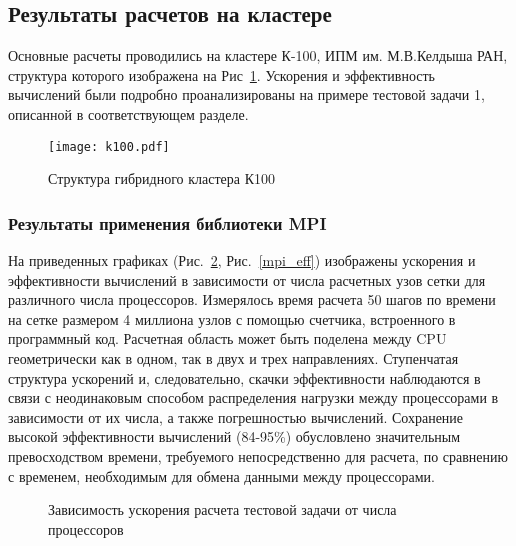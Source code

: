 \subsection{Результаты расчетов на кластере}

Основные расчеты проводились на кластере К-100, ИПМ им. М.В.Келдыша РАН, 
структура которого изображена на Рис~\ref{pic_k100}.
Ускорения и эффективность вычислений
были подробно проанализированы на примере тестовой задачи 1, описанной в соответствующем
разделе. 

\begin{figure}[!h]\center
\texttt{[image: k100.pdf]} 
\caption{Структура гибридного кластера К100}
\label{pic_k100}
\end{figure}

\subsubsection*{Результаты применения библиотеки MPI}

На приведенных графиках (Рис.~\ref{mpi_speedup}, Рис.~\ref{mpi_eff}) изображены
ускорения и эффективности вычислений в зависимости от числа расчетных узов сетки для 
различного числа процессоров.
Измерялось время расчета 50 шагов по времени на сетке размером 4 миллиона узлов
с помощью счетчика, встроенного в программный код.
Расчетная область может быть поделена между CPU геометрически как в одном, так в двух и трех направлениях.
Ступенчатая структура ускорений и, следовательно, скачки эффективности наблюдаются
в связи с неодинаковым способом распределения нагрузки между процессорами
в зависимости от их числа, а также погрешностью вычислений. Сохранение высокой
эффективности вычислений (84-95\%) обусловлено значительным превосходством времени, требуемого
непосредственно для расчета, по сравнению с временем, необходимым для обмена данными
между процессорами.

\begin{figure}
\begin{center}
\caption{Зависимость ускорения расчета тестовой задачи от числа процессоров}
\label{mpi_speedup}
\end{center}
\end{figure}

